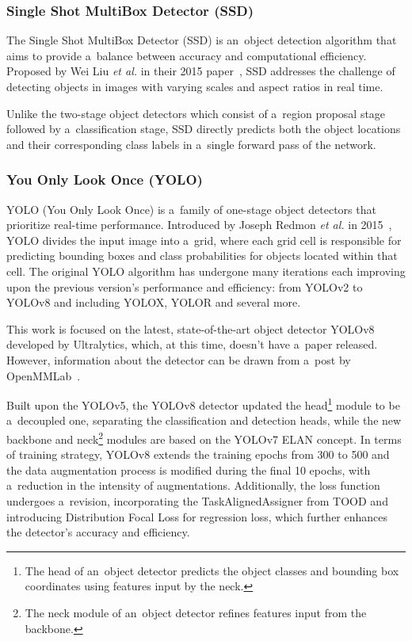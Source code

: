 \subsubsection{Single Shot MultiBox Detector (SSD)}

The Single Shot MultiBox Detector (SSD) is an~object detection algorithm that
aims to provide a~balance between accuracy and computational efficiency.
Proposed by Wei Liu \textit{et al.} in their 2015 paper~\cite{Liu2015}, SSD
addresses the challenge of detecting objects in images with varying scales and
aspect ratios in real time.

Unlike the two-stage object detectors which consist of a~region proposal stage
followed by a~classification stage, SSD directly predicts both the object
locations and their corresponding class labels in a~single forward pass of the
network.


\subsubsection{You Only Look Once (YOLO)}

YOLO (You Only Look Once) is a~family of one-stage object detectors that
prioritize real-time performance. Introduced by Joseph Redmon \textit{et al.} in
2015~\cite{Redmon2015}, YOLO divides the input image into a~grid, where each
grid cell is responsible for predicting bounding boxes and class probabilities
for objects located within that cell. The original YOLO algorithm has undergone
many iterations each improving upon the previous version's performance and
efficiency: from YOLOv2 to YOLOv8 and including YOLOX, YOLOR and several more.

This work is focused on the latest, state-of-the-art object detector
YOLOv8~\cite{YOLOv8} developed by Ultralytics, which, at this time, doesn't have
a~paper released. However, information about the detector can be drawn from
a~post by OpenMMLab~\cite{YOLOv8OpenMMLab}.

Built upon the YOLOv5, the YOLOv8 detector updated the head\footnote{The head of
an~object detector predicts the object classes and bounding box coordinates
using features input by the neck.} module to be a~decoupled one, separating the
classification and detection heads, while the new backbone and neck\footnote{The
neck module of an~object detector refines features input from the backbone.}
modules are based on the YOLOv7 ELAN concept. In terms of training strategy,
YOLOv8 extends the training epochs from 300 to 500 and the data augmentation
process is modified during the final 10 epochs, with a~reduction in the
intensity of augmentations. Additionally, the loss function undergoes
a~revision, incorporating the TaskAlignedAssigner from TOOD and introducing
Distribution Focal Loss for regression loss, which further enhances the
detector's accuracy and efficiency.


